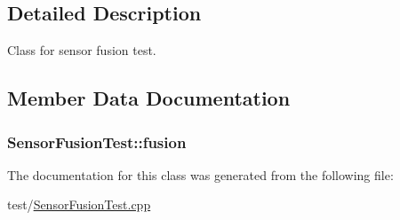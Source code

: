 \subsection{Detailed Description}
Class for sensor fusion test. 

\subsection{Member Data Documentation}
\subsubsection[{\texorpdfstring{fusion}{fusion}}]{ Sensor\+Fusion\+Test\+::fusion\hspace{0.3cm}{\ttfamily [protected]}}\hypertarget{class_sensor_fusion_test_a2f23e29ade2dcdec5510cc2b893c9cc7}{}\label{class_sensor_fusion_test_a2f23e29ade2dcdec5510cc2b893c9cc7}


The documentation for this class was generated from the following file\+:\begin{DoxyCompactItemize}
\item 
test/\hyperlink{_sensor_fusion_test_8cpp}{Sensor\+Fusion\+Test.\+cpp}\end{DoxyCompactItemize}
